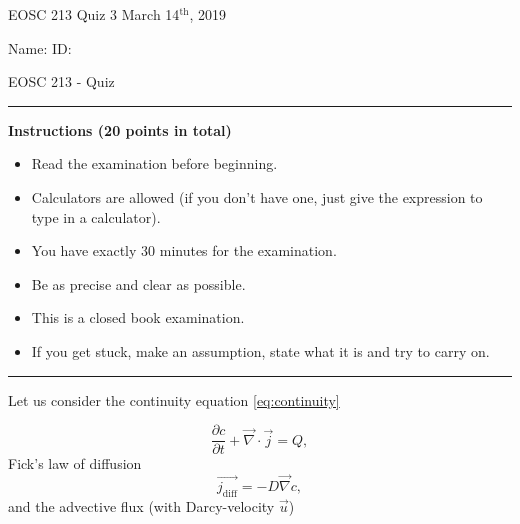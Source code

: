 \documentclass{article}
\begin{document}
\pagestyle{empty}

\large{EOSC 213 Quiz 3} \hspace{10cm} \large{March 14$^{\textrm{th}}$, 2019}

\large{Name: } \hspace{12cm} \large{ID: }
\begin{center}
\Huge{EOSC 213 - Quiz}
\end{center}

\rule{\textwidth}{1pt}

\large{\textbf{Instructions (20 points in total)}}
\begin{multicols}{2}
\begin{itemize}
\item Read the examination before beginning.
\item Calculators are allowed (if you don't have one, just give the expression to type in a calculator).
\item You have exactly 30 minutes for the examination.
\item Be as precise and clear as possible.
\item This is a closed book examination.
\item If you get stuck, make an assumption, state what it is and try to carry on.
\end{itemize} 
\end{multicols}


\rule{\textwidth}{1pt}


Let us consider the continuity equation \ref{eq:continuity}

\begin{equation}
\frac{\partial c}{\partial t} + \overrightarrow{\nabla} \cdot \overrightarrow{j} = Q, \label{eq:continuity}
\end{equation} Fick's law of diffusion
\begin{equation}
\overrightarrow{j_{\mathrm{diff}}} = - D \overrightarrow{\nabla} c, \label{eq:fick}
\end{equation} and the advective flux (with Darcy-velocity $\overrightarrow{u}$)
\end{document}
